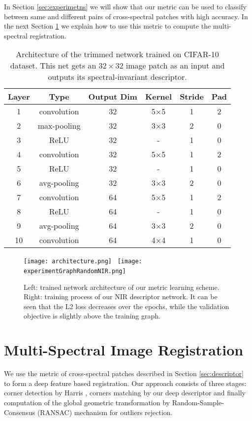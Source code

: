 \documentclass[10pt,twocolumn,letterpaper]{article}
\begin{document}
In Section \ref{sec:experimetns} we will show that our metric can be used to classify between same and different pairs of cross-spectral patches with high accuracy. In the next Section \ref{sec:registration} we explain how to use this metric to compute the multi-spectral registration.

\begin{table}
	\centering
	\begin{tabular}{ c | c | c | c | c | c}
		Layer & Type & Output Dim & Kernel & Stride & Pad\\
		\hline
		1 & convolution & 32 & 5$\times$5 & 1 & 2\\
		2 & max-pooling & 32 & 3$\times$3 & 2 & 0\\
		3 & ReLU & 32 & - & 1 & 0 \\
		4 & convolution & 32 & 5$\times$5 & 1 & 2\\
		5 & ReLU & 32 & - & 1 & 0\\
		6 & avg-pooling & 32 & 3$\times$3 & 2 & 0\\
		7 & convolution & 64 & 5$\times$5 & 1 & 2\\
		8 & ReLU & 64 & - & 1 & 0\\
		9 & avg-pooling & 64 & 3$\times$3 & 2 & 0\\
		10 & convolution & 64 & 4$\times$4 & 1 & 0
	\end{tabular}
	\caption{Architecture of the trimmed network trained on CIFAR-10 dataset. This net gets an $32\times 32$ image patch as an input and outputs its spectral-invariant descriptor.}
	\label{table:1}
\end{table}

\begin{figure}
	\centering
	\texttt{[image: architecture.png]}~
	\texttt{[image: experimentGraphRandomNIR.png]}~
	
	\caption{Left: trained network architecture of our metric learning scheme. Right: training process of our NIR descriptor network. It can be seen that the L2 loss decreases over the epochs, while the validation objective is slightly above the training graph.}
	\label{fig:2}       %
\end{figure}


\section{Multi-Spectral Image Registration} \label{sec:registration}

We use the metric of cross-spectral patches described in Section \ref{sec:descriptor} to form a deep feature based registration. Our approach consists of three stages: corner detection by Harris \cite{harris}, corners matching by our deep descriptor and finally computation of the global geometric transformation by Random-Sample-Consensus (RANSAC) \cite{ransac} mechanism for outliers rejection.
\end{document}
